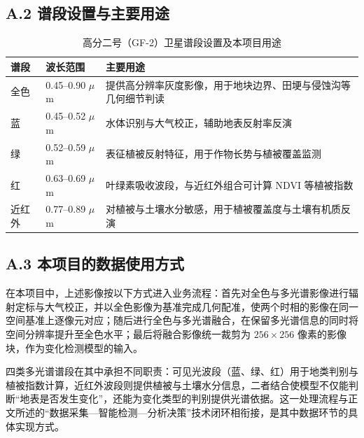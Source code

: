 \subsection{A.2 谱段设置与主要用途}

\begin{table}[htbp]
    \centering
    \caption{高分二号（GF-2）卫星谱段设置及本项目用途}
    \label{tab:gf2-bands}
    \small
    \begin{tabular}{|p{2.4cm}|p{3.4cm}|p{7.6cm}|}
        \hline
        \textbf{谱段} & \textbf{波长范围} & \textbf{主要用途} \\
        \hline
        全色 & 0.45--0.90 $\mu$m & 提供高分辨率灰度影像，用于地块边界、田埂与侵蚀沟等几何细节判读 \\
        \hline
        蓝 & 0.45--0.52 $\mu$m & 水体识别与大气校正，辅助地表反射率反演 \\
        \hline
        绿 & 0.52--0.59 $\mu$m & 表征植被反射特征，用于作物长势与植被覆盖监测 \\
        \hline
        红 & 0.63--0.69 $\mu$m & 叶绿素吸收波段，与近红外组合可计算 NDVI 等植被指数 \\
        \hline
        近红外 & 0.77--0.89 $\mu$m & 对植被与土壤水分敏感，用于植被覆盖度与土壤有机质反演 \\
        \hline
    \end{tabular}
\end{table}

\subsection{A.3 本项目的数据使用方式}

在本项目中，上述影像按以下方式进入业务流程：首先对全色与多光谱影像进行辐射定标与大气校正，并以全色影像为基准完成几何配准，使两个时相的影像在同一空间基准上逐像元对应；随后进行全色与多光谱融合，在保留多光谱信息的同时将空间分辨率提升至全色水平；最后将融合影像统一裁剪为 $256 \times 256$ 像素的影像块，作为变化检测模型的输入。

四类多光谱谱段在其中承担不同职责：可见光波段（蓝、绿、红）用于地类判别与植被指数计算，近红外波段则提供植被与土壤水分信息，二者结合使模型不仅能判断“地表是否发生变化”，还能为变化类型的判别提供光谱依据。这一处理流程与正文所述的“数据采集—智能检测—分析决策”技术闭环相衔接，是其中数据环节的具体实现方式。
